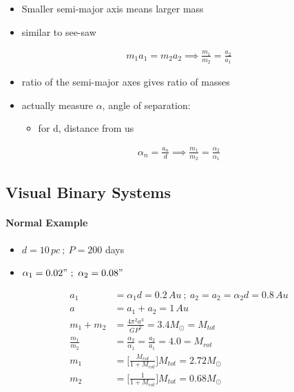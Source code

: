 \documentclass[a4paper,11pt,normalem]{article}
\begin{document}
\begin{itemize}
    \item Smaller semi-major axis means larger mass
    \item similar to see-saw
\end{itemize}
\begin{align}
    m_1 a_1 = m_2 a_2 \implies \frac{m_1}{m_2} = \frac{a_2}{a_1}
\end{align}

\begin{itemize}
    \item ratio of the semi-major axes gives ratio of masses
    \item actually measure \(\alpha\), angle of separation:
        \begin{itemize}
            \item for d, distance from us
        \end{itemize}
\end{itemize}
\begin{align}
    \alpha_n = \frac{a_n}{d} \implies \frac{m_1}{m_2} = \frac{\alpha_2}{\alpha_1}
\end{align}

\subsection{Visual Binary Systems}
\paragraph{Normal Example}
\begin{itemize}
    \item \(d = 10\,pc ~;~ P = 200\) days
    \item \(\alpha_1 = 0.02" ~;~ \alpha_2 = 0.08"\)
\end{itemize}

\begin{align}
    a_1 &= \alpha_1 d = 0.2\,Au ~;~ a_2 = a_2 = \alpha_2 d = 0.8\,Au \\
    a &= a_1 + a_2 = 1\,Au \\
    m_1 + m_2 &= \frac{4\pi^2 a^3}{GP^2} = 3.4 M_\odot = M_{tot} \\
    \frac{m_1}{m_2} &= \frac{\alpha_2}{\alpha_1} = \frac{a_2}{a_1} = 4.0 = M_{rot}\\
    m_1 &= \Big[\frac{M_{rot}}{1 + M_{rot}}\Big]M_{tot} = 2.72 M_\odot\\
    m_2 &= \Big[\frac{1}{1 + M_{rot}}\Big]M_{tot} = 0.68 M_\odot
\end{align}
\end{document}

